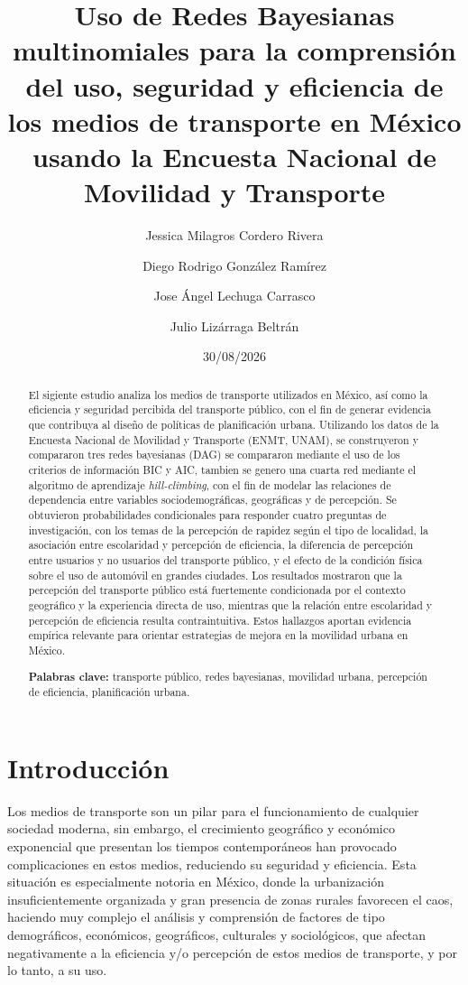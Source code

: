 \documentclass[
  letterpaper,
  DIV=11,
  numbers=noendperiod]{scrartcl}
\title{Uso de Redes Bayesianas multinomiales para la comprensión del uso, seguridad y eficiencia de los medios de transporte en México usando la Encuesta Nacional de Movilidad y Transporte}
\author{
Jessica Milagros Cordero Rivera
\and
Diego Rodrigo González Ramírez
\and
Jose Ángel Lechuga Carrasco
\and
Julio Lizárraga Beltrán
}
\date{30/08/2026}
\begin{document}
\maketitle


\begin{abstract}
El sigiente estudio analiza los medios de transporte utilizados en México, así como la eficiencia y seguridad percibida del transporte público, con el fin de generar evidencia que contribuya al diseño de políticas de planificación urbana. Utilizando los datos de la Encuesta Nacional de Movilidad y Transporte (ENMT, UNAM), se construyeron y compararon tres redes bayesianas (DAG) se compararon mediante el uso de los criterios de información BIC y AIC, tambien se genero una cuarta red mediante el algoritmo de aprendizaje \textit{hill-climbing}, con el fin de modelar las relaciones de dependencia entre variables sociodemográficas, geográficas y de percepción. Se obtuvieron probabilidades condicionales para responder cuatro preguntas de investigación, con los temas de la percepción de rapidez según el tipo de localidad, la asociación entre escolaridad y percepción de eficiencia, la diferencia de percepción entre usuarios y no usuarios del transporte público, y el efecto de la condición física sobre el uso de automóvil en grandes ciudades. Los resultados mostraron que la percepción del transporte público está fuertemente condicionada por el contexto geográfico y la experiencia directa de uso, mientras que la relación entre escolaridad y percepción de eficiencia resulta contraintuitiva. Estos hallazgos aportan evidencia empírica relevante para orientar estrategias de mejora en la movilidad urbana en México.

\textbf{Palabras clave:} transporte público, redes bayesianas, movilidad
urbana, percepción de eficiencia, planificación urbana.
\end{abstract}



\section{Introducción}\label{Introducción}
Los medios de transporte son un pilar para el funcionamiento de cualquier sociedad 
moderna, sin embargo, el crecimiento geográfico y económico exponencial que presentan 
los tiempos contemporáneos han provocado complicaciones en estos medios, reduciendo su 
seguridad y eficiencia. Esta situación es especialmente notoria en México, donde la 
urbanización insuficientemente organizada y gran presencia de zonas rurales favorecen 
el caos, haciendo muy complejo el análisis y comprensión de factores de tipo 
demográficos, económicos, geográficos, culturales y sociológicos, que afectan 
negativamente a la eficiencia y/o percepción de estos medios de transporte, 
y por lo tanto, a su uso.
\end{document}
